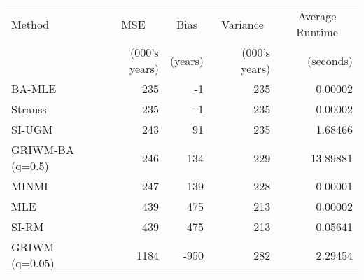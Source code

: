 
\begin{tabular}{lrrrr}
\toprule
\multicolumn{1}{l}{Method} & \multicolumn{1}{c}{MSE} & \multicolumn{1}{c}{Bias} & \multicolumn{1}{c}{Variance} & \multicolumn{1}{c}{Average Runtime} \\
 & (000's years) & (years) & (000's years) & (seconds)\\
\midrule
BA-MLE & 235 & -1 & 235 & 0.00002\\
Strauss & 235 & -1 & 235 & 0.00002\\
SI-UGM & 243 & 91 & 235 & 1.68466\\
GRIWM-BA (q=0.5) & 246 & 134 & 229 & 13.89881\\
MINMI & 247 & 139 & 228 & 0.00001\\
\addlinespace
MLE & 439 & 475 & 213 & 0.00002\\
SI-RM & 439 & 475 & 213 & 0.05641\\
GRIWM (q=0.05) & 1184 & -950 & 282 & 2.29454\\
\bottomrule
\end{tabular}
